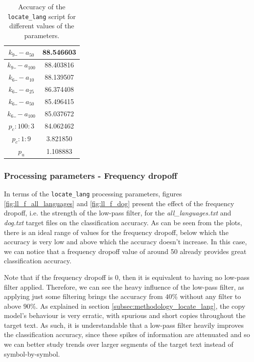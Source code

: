 \documentclass{article}
\begin{document}
\begin{table}
\begin{tabular}{|c|c|}
    $k_9\_-a_{50}$ & 88.546603 \\ \hline
    $k_9\_-a_{100}$ & 88.403816 \\ \hline
    $k_6\_-a_{10}$ & 88.139507 \\ \hline
    $k_6\_-a_{25}$ & 86.374408 \\ \hline
    $k_6\_-a_{50}$ & 85.496415 \\ \hline
    $k_6\_-a_{100}$ & 85.037672 \\ \hline
    $p_c:100:3$ & 84.062462 \\ \hline
    $p_c:1:9$ & 3.821850 \\ \hline
    $p_u$ & 1.108883 \\ \hline
    
    \end{tabular}
    \label{tab:locate_lang_accuracy}
    \caption{Accuracy of the \texttt{locate\_lang} script for different values of the parameters.}
\end{table}

\subsubsection{Processing parameters - Frequency dropoff}
\label{subsubsec:results_locate_lang_frequency_dropoff}

In terms of the \texttt{locate\_lang} processing parameters, figures \ref{fig:ll_f_all_languages} and \ref{fig:ll_f_dog} present the effect of the frequency dropoff, i.e. the strength of the low-pass filter, for the \textit{all\_languages.txt} and \textit{dog.txt} target files on the classification accuracy.
As can be seen from the plots, there is an ideal range of values for the frequency dropoff, below which the accuracy is very low and above which the accuracy doesn't increase.
In this case, we can notice that a frequency dropoff value of around 50 already provides great classification accuracy.

Note that if the frequency dropoff is 0, then it is equivalent to having no low-pass filter applied.
Therefore, we can see the heavy influence of the low-pass filter, as applying just some filtering brings the accuracy from $40\%$ without any filter to above $90\%$.
As explained in section \ref{subsec:methodology_locate_lang}, the copy model's behaviour is very erratic, with spurious and short copies throughout the target text.
As such, it is understandable that a low-pass filter heavily improves the classification accuracy, since these spikes of information are attenuated and so we can better study trends over larger segments of the target text instead of symbol-by-symbol.
\end{document}
